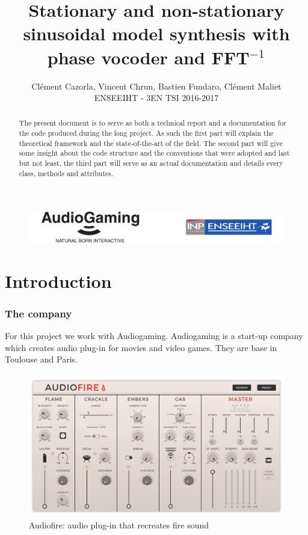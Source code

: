 \documentclass[]{article}
\title{Stationary and non-stationary sinusoidal model synthesis with phase vocoder and FFT$^{-1}$}
\author{Cl\'ement Cazorla, Vincent Chrun, Bastien Fundaro, Cl\'ement Maliet \\ENSEEIHT - 3EN TSI 2016-2017}
\begin{document}
\maketitle

\begin{abstract}
The present document is to serve as both a technical report and a documentation for the code produced during the long project. As such the first part will explain the theoretical framework and the state-of-the-art of the field. The second part will give some insight about the code structure and the conventions that were adopted and last but not least, the third part will serve as an actual documentation and details every class, methods and attributes.
\end{abstract}

	\begin{figure}
		
		\includegraphics[scale=0.28]{agn7.png}
	\end{figure}
\newpage
\tableofcontents


\newpage
\part{Introduction}\label{sec:introduction}

\section{The company}\label{sec:the-company}
For this project we work with Audiogaming. Audiogaming is a start-up company which creates audio
plug-in for movies and video games. They are base in Toulouse and Paris.
\begin{figure}[H]
	\centering
	\includegraphics[scale=0.19]{AudioFire_screen.png}
	\caption{Audiofire: audio plug-in that recreates fire sound}
\end{figure}
\end{document}
